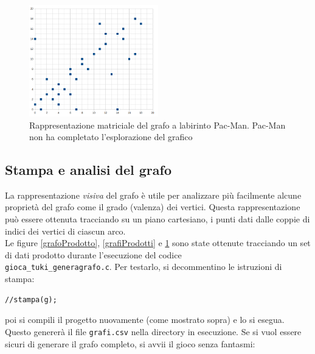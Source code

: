 \documentclass[8pt]{book}
\begin{document}
\begin{figure}
  \centering
  \includegraphics[width=0.5\textwidth]{img/tuki_grafo_parziale.png}
  \caption{Rappresentazione matriciale del grafo a labirinto Pac-Man. Pac-Man non ha completato l'esplorazione del grafico}
  \label{grafoParziale}
\end{figure}

\subsection{Stampa e analisi del grafo}

La rappresentazione \emph{visiva} del grafo è utile per analizzare più facilmente alcune proprietà del grafo come il grado (valenza) dei vertici. Questa rappresentazione può essere ottenuta tracciando su un piano cartesiano, i punti dati dalle coppie di indici dei vertici di ciascun arco.\\
Le figure \ref{grafoProdotto}, \ref{grafiProdotti} e \ref{grafoParziale} sono state ottenute tracciando un set di dati prodotto durante l'esecuzione del codice \\\texttt{gioca\_tuki\_generagrafo.c}. Per testarlo, si decommentino le istruzioni di stampa:

\begin{spacing}{0.9}
  \begin{small}
\begin{tcolorbox}
\begin{verbatim}
//stampa(g);
\end{verbatim}
    \end{tcolorbox}
  \end{small}
\end{spacing}


poi si compili il progetto nuovamente (come mostrato sopra) e lo si esegua. Questo genererà il file \texttt{grafi.csv} nella directory in esecuzione. Se si vuol essere sicuri di generare il grafo completo, si avvii il gioco senza fantasmi:\\
\end{document}
